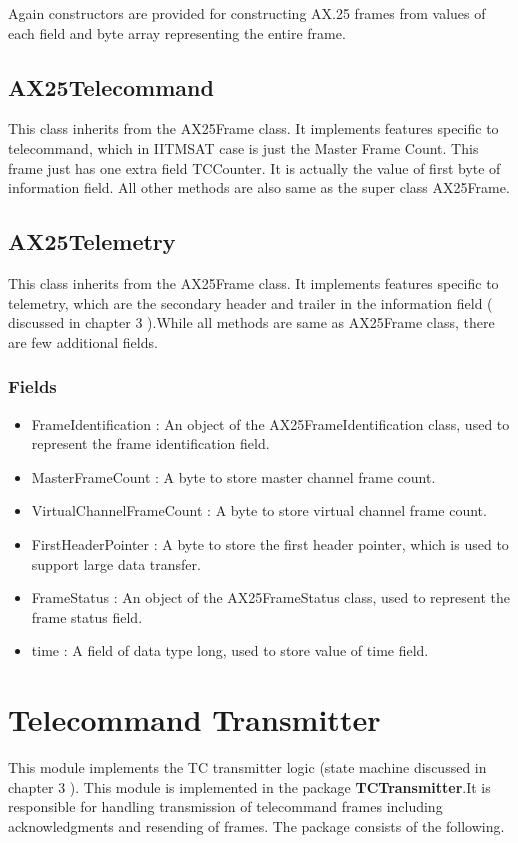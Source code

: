 \documentclass[BTech]{iitmdiss}
\begin{document}
Again constructors are provided for constructing AX.25 frames from values of each field and byte array representing the entire frame.

\subsection{AX25Telecommand}
This class inherits from the AX25Frame class. It implements features specific to telecommand, which in IITMSAT case is just the Master Frame Count. This frame just has one extra field TCCounter. It is actually the value of first byte of information field. All other methods are also same as the super class AX25Frame.
\subsection{AX25Telemetry}
This class inherits from the AX25Frame class. It implements features specific to telemetry, which are the secondary header and trailer in the information field ( discussed in chapter 3 ).While all methods are same as AX25Frame class, there are few additional fields.
\subsubsection{Fields}
\begin{itemize}
\item FrameIdentification : An object of the AX25FrameIdentification class, used to represent the frame identification field.
\item MasterFrameCount :  A byte to store master channel frame count.
\item VirtualChannelFrameCount : A byte to store virtual channel frame count.
\item FirstHeaderPointer :  A byte to store the first header pointer, which is used to support large data transfer.
\item FrameStatus : An object of the AX25FrameStatus class, used to represent the frame status field.
\item time : A field of data type long, used to store value of time field.
\end{itemize}



\section{Telecommand Transmitter}
This module implements the TC transmitter logic (state machine discussed in chapter 3 ). This module is implemented in the package \textbf{TCTransmitter}.It is responsible for handling transmission of telecommand frames including acknowledgments and resending of frames. The package consists of the following.
\end{document}

